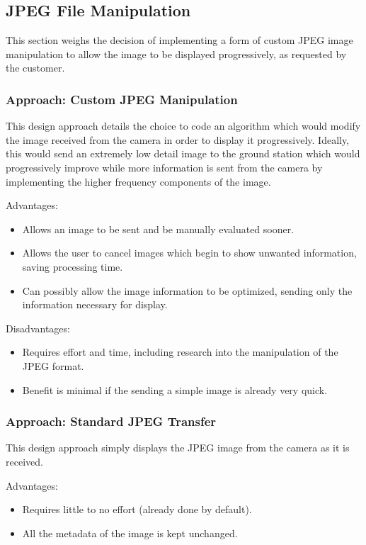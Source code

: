 \subsection{JPEG File Manipulation}
\label{sec:jpegmanipulation}

This section weighs the decision of implementing a 
form of custom JPEG image manipulation to allow the 
image to be displayed progressively, as requested by the customer.

\subsubsection{Approach: Custom JPEG Manipulation}

This design approach details the choice to code an algorithm which 
would modify the image received from the camera in order to 
display it progressively. Ideally, this would send an extremely low 
detail image to the ground station which would progressively improve 
while more information is sent from the camera by implementing 
the higher frequency components of the image.

Advantages:
\begin{itemize}
	\item Allows an image to be sent and 
                     be manually evaluated sooner.
	\item Allows the user to cancel images which begin to show 
		unwanted information, saving processing time.
	\item Can possibly allow the image information to be 
		optimized, sending only the 
		information necessary for display.
\end{itemize}

Disadvantages:
\begin{itemize}
	\item Requires effort and time, including research into 
		the manipulation of the JPEG format.
	\item Benefit is minimal if the sending a simple image 
		is already very quick.
\end{itemize}

\subsubsection{Approach: Standard JPEG Transfer}

This design approach simply displays the JPEG image from 
the camera as it is received. 

Advantages:
\begin{itemize}
	\item Requires little to no effort 
		(already done by default).
	\item All the metadata of the image is kept unchanged.
\end{itemize}

